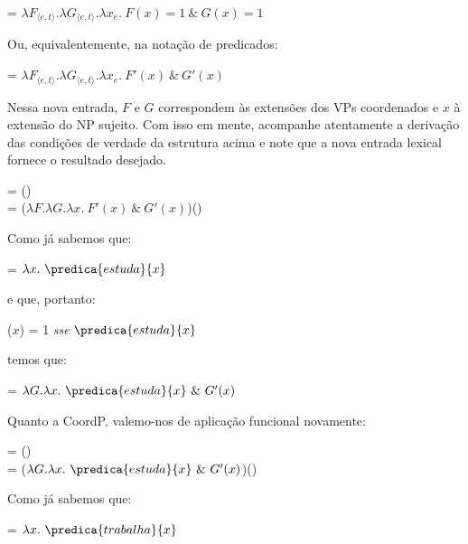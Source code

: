\begin{exe}
	\ex {} = $\lambda F_{\langle e,t\rangle}.\lambda G_{\langle e,t\rangle}.\lambda x_{e}.\ F(x)=1\ \&\ G(x)=1$
\end{exe}

\n Ou, equivalentemente, na notação de predicados:

\begin{exe}
	\ex {} = $\lambda F_{\langle e,t\rangle}.\lambda G_{\langle e,t\rangle}.\lambda x_{e}.\ F'(x)\ \&\ G'(x)$
\end{exe}

\n Nessa nova entrada, $F$ e $G$ correspondem às extensões dos VPs coordenados e $x$ à extensão do NP sujeito. Com isso em mente, acompanhe atentamente a deriva\-ção das condi\-çõ\-es de
verdade da estrutura acima e note que a nova entrada lexical fornece
o resultado desejado.

\begin{exe}
	\ex {} = ()\\
	= ($\lambda F.\lambda G.\lambda x.\ F'(x)\ \&\ G'(x)$)()
\end{exe}


\n Como já sabemos que:

\begin{exe}
	\ex {} = $\lambda x.\ \predica{estuda}{x}$
\end{exe}

\n e que, portanto:

\begin{exe}
	\ex {}($x$) = 1 \textit{sse} $\predica{estuda}{x}$
\end{exe}

\n temos que:

\begin{exe}
	\ex {} = $\lambda G.\lambda x.\ \predica{estuda}{x}\ \&\ G'(x)$
\end{exe}

\n Quanto a CoordP, valemo-nos de aplica\-ção funcional
novamente:

\begin{exe}
	\ex {} = () \\
	= ($\lambda G.\lambda x.\ \predica{estuda}{x}\ \&\ G'(x)$)()
\end{exe}

\n Como já sabemos que:

\begin{exe}
	\ex {} = $\lambda x.\ \predica{trabalha}{x}$
\end{exe}

